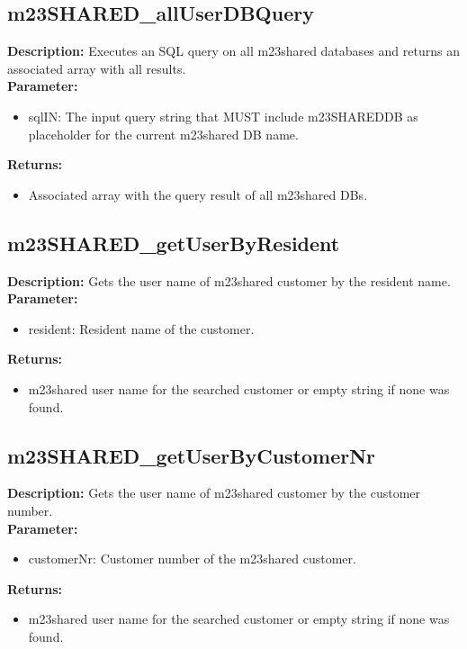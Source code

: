 \subsection{m23SHARED\_allUserDBQuery}
\textbf{Description:} Executes an SQL query on all m23shared databases and returns an associated array with all results.\\
\textbf{Parameter:}
\begin{itemize}
\item sqlIN: The input query string that MUST include m23SHAREDDB as placeholder for the current m23shared DB name.
\end{itemize}
\textbf{Returns:}
\begin{itemize}
\item Associated array with the query result of all m23shared DBs.
\end{itemize}

\subsection{m23SHARED\_getUserByResident}
\textbf{Description:} Gets the user name of m23shared customer by the resident name.\\
\textbf{Parameter:}
\begin{itemize}
\item resident: Resident name of the customer.
\end{itemize}
\textbf{Returns:}
\begin{itemize}
\item m23shared user name for the searched customer or empty string if none was found.
\end{itemize}

\subsection{m23SHARED\_getUserByCustomerNr}
\textbf{Description:} Gets the user name of m23shared customer by the customer number.\\
\textbf{Parameter:}
\begin{itemize}
\item customerNr: Customer number of the m23shared customer.
\end{itemize}
\textbf{Returns:}
\begin{itemize}
\item m23shared user name for the searched customer or empty string if none was found.
\end{itemize}

